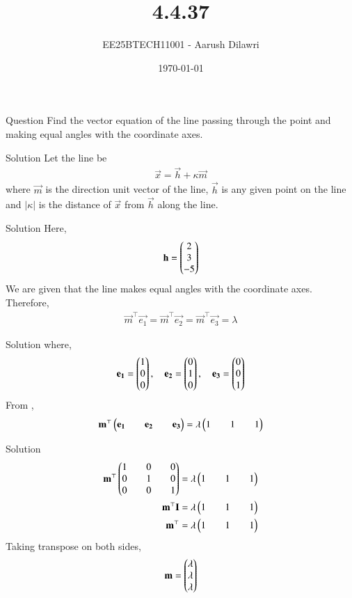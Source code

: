 \documentclass{beamer}
\title{4.4.37}
\date{\today}
\author{EE25BTECH11001 - Aarush Dilawri}
\begin{document}
\frame{\titlepage}


\begin{frame}{Question}
Find the vector equation of the line passing through the point  and making equal angles with the coordinate axes.
\end{frame}

\begin{frame}{Solution}
Let the line be
\begin{align}
    \vec{x} = \vec{h} + \kappa\vec{m}
\end{align}
where $\vec{m}$ is the direction unit vector of the line, $\vec{h}$ is any given point on the line and $\lvert \kappa \rvert$ is the distance of $\vec{x}$ from $\vec{h}$ along the line.
\end{frame}

\begin{frame}{Solution}
Here,
\begin{align}
    \mathbf{h} = \begin{pmatrix}2 \\ 3 \\ -5\end{pmatrix}
\end{align}
We are given that the line makes equal angles with the coordinate axes. Therefore,
\begin{align}
    \vec{m}^\top\vec{e_1} = \vec{m}^\top\vec{e_2} = \vec{m}^\top\vec{e_3} = \lambda
\end{align}
\end{frame}

\begin{frame}{Solution}
where,
\begin{align}
    \mathbf{e_1} = \begin{pmatrix}1 \\ 0 \\ 0\end{pmatrix}, \quad
    \mathbf{e_2} = \begin{pmatrix}0 \\ 1 \\ 0\end{pmatrix}, \quad
    \mathbf{e_3} = \begin{pmatrix}0 \\ 0 \\ 1\end{pmatrix}
\end{align}
From ,
\begin{align}
    \mathbf{m}^\top\begin{pmatrix}\mathbf{e_1} && \mathbf{e_2} && \mathbf{e_3}\end{pmatrix} = \lambda\begin{pmatrix}1 && 1 && 1\end{pmatrix}
\end{align}
\end{frame}

\begin{frame}{Solution}
\begin{align}
    \mathbf{m}^\top\begin{pmatrix}1 && 0 && 0 \\ 0 && 1 && 0 \\ 0 && 0 && 1\end{pmatrix} = \lambda\begin{pmatrix}1 && 1 && 1\end{pmatrix}\\
    \mathbf{m}^\top\mathbf{I} = \lambda\begin{pmatrix}1 && 1 && 1\end{pmatrix}\\
    \mathbf{m}^\top = \lambda\begin{pmatrix}1 && 1 && 1\end{pmatrix}
\end{align}
Taking transpose on both sides,
\begin{align}
    \mathbf{m} = \begin{pmatrix}\lambda \\ \lambda \\ \lambda\end{pmatrix}
\end{align}
\end{frame}
\end{document}
